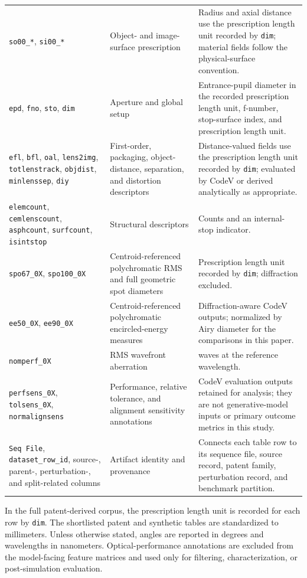 \begin{longtable}{@{}p{}p{}p{}@{}}
\texttt{so00\_*}, \texttt{si00\_*} & Object- and image-surface prescription & Radius and axial distance use the prescription length unit recorded by \texttt{dim}; material fields follow the physical-surface convention. \\
\texttt{epd}, \texttt{fno}, \texttt{sto}, \texttt{dim} & Aperture and global setup & Entrance-pupil diameter in the recorded prescription length unit, f-number, stop-surface index, and prescription length unit. \\
\texttt{efl}, \texttt{bfl}, \texttt{oal}, \texttt{lens2img}, \texttt{totlenstrack}, \texttt{objdist}, \texttt{minlenssep}, \texttt{diy} & First-order, packaging, object-distance, separation, and distortion descriptors & Distance-valued fields use the prescription length unit recorded by \texttt{dim}; evaluated by CodeV or derived analytically as appropriate. \\
\texttt{elemcount}, \texttt{cemlenscount}, \texttt{asphcount}, \texttt{surfcount}, \texttt{isintstop} & Structural descriptors & Counts and an internal-stop indicator. \\
\texttt{spo67\_0X}, \texttt{spo100\_0X} & Centroid-referenced polychromatic RMS and full geometric spot diameters & Prescription length unit recorded by \texttt{dim}; diffraction excluded. \\
\texttt{ee50\_0X}, \texttt{ee90\_0X} & Centroid-referenced polychromatic encircled-energy measures & Diffraction-aware CodeV outputs; normalized by Airy diameter for the comparisons in this paper. \\
\texttt{nomperf\_0X} & RMS wavefront aberration & waves at the reference wavelength. \\
\texttt{perfsens\_0X}, \texttt{tolsens\_0X}, \texttt{normalignsens} & Performance, relative tolerance, and alignment sensitivity annotations & CodeV evaluation outputs retained for analysis; they are not generative-model inputs or primary outcome metrics in this study. \\
\texttt{Seq File}, \texttt{dataset\_row\_id}, source-, parent-, perturbation-, and split-related columns & Artifact identity and provenance & Connects each table row to its sequence file, source record, patent family, perturbation record, and benchmark partition. \\
\end{longtable}
\normalsize

In the full patent-derived corpus, the prescription length unit is recorded for each row by \texttt{dim}. The shortlisted patent and synthetic tables are standardized to millimeters. Unless otherwise stated, angles are reported in degrees and wavelengths in nanometers. Optical-performance annotations are excluded from the model-facing feature matrices and used only for filtering, characterization, or post-simulation evaluation.

